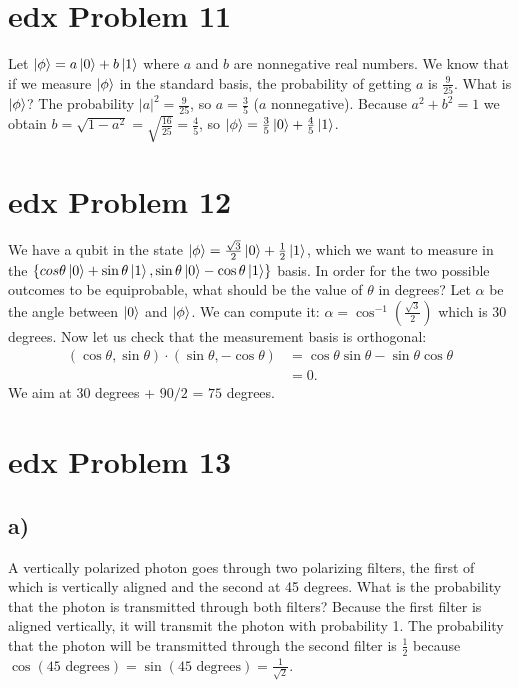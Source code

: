 \documentclass[10pt]{article}
\begin{document}
\section*{edx Problem 11}
\color{blue} Let $\ket{\phi} = a\ket{0} + b\ket{1}$ where $a$ and $b$ are nonnegative real numbers. We know that if we measure $\ket{\phi}$ in the standard basis, the probability of getting $a$ is $\frac{9}{25}$. What is $\ket{\phi}$?
\color{black} The probability $|a|^2 = \frac{9}{25}$, so $a = \frac{3}{5}$ ($a$ nonnegative). Because $a^2 + b^2 = 1$ we obtain $b = \sqrt{1 - a^2} = \sqrt{\frac{16}{25}} = \frac{4}{5}$, so $\ket{\phi} = \frac{3}{5} \ket{0} + \frac{4}{5} \ket{1}$. 

\section*{edx Problem 12}
\color{blue} We have a qubit in the state $\ket{\phi} = \frac{\sqrt{3}}{2} \ket{0} + \frac{1}{2} \ket{1}$, which we want to measure in the $\{ cos \theta \ket{0} + \sin \theta \ket{1}, \sin \theta \ket{0} - \cos \theta \ket{1} \}$ basis. In order for the two possible outcomes to be equiprobable, what should be the value of $\theta$ in degrees?
\color{black} Let $\alpha$ be the angle between $\ket{0}$ and $\ket{\phi}$. We can compute it: $\alpha = \cos^{-1}(\frac{\sqrt{3}}{2})$ which is 30 degrees. Now let us check that the measurement basis is orthogonal:
\begin{align*}
(\cos \theta, \sin \theta) \cdot (\sin \theta, -\cos \theta) &= \cos \theta \sin \theta - \sin \theta \cos \theta \\
  &= 0.
\end{align*}
We aim at $30$ degrees + $90 / 2$ = $75$ degrees.

\section*{edx Problem 13}
\subsection*{a)}
\color{blue} A vertically polarized photon goes through two polarizing filters, the first of which is vertically aligned and the second at 45 degrees. What is the probability that the photon is transmitted through both filters?
\color{black} Because the first filter is aligned vertically, it will transmit the photon with probability 1. The probability that the photon will be transmitted through the second filter is $\frac{1}{2}$ because $\cos(45 \text{ degrees}) = \sin(45 \text{ degrees}) = \frac{1}{\sqrt{2}}$.
\end{document}
